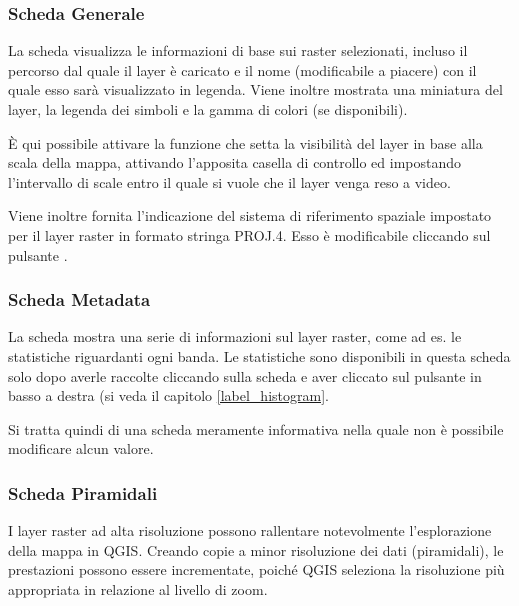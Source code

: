 \subsubsection{Scheda Generale}\label{label_generaltab}

La scheda  visualizza le informazioni di base sui raster selezionati,
incluso il percorso dal quale il layer è caricato e il nome (modificabile a
piacere) con il quale esso sarà visualizzato in legenda. Viene inoltre
mostrata una miniatura del layer, la legenda dei simboli e la gamma di
colori (se disponibili). 

È qui possibile attivare la funzione che setta la visibilità del layer
in base alla scala della mappa, attivando l'apposita casella di controllo ed
impostando l'intervallo di scale entro il quale si vuole che il layer venga
reso a video.

Viene inoltre fornita l'indicazione del sistema di riferimento spaziale
impostato per il layer raster in formato stringa PROJ.4. Esso è modificabile
cliccando sul pulsante .

\subsubsection{Scheda Metadata}\label{label_metatab}

La scheda  mostra una serie di informazioni sul layer
raster, come ad es. le statistiche riguardanti ogni banda. Le statistiche sono
disponibili in questa scheda solo dopo averle raccolte cliccando sulla
scheda  e aver cliccato sul pulsante  in
basso a destra (si veda il capitolo \ref{label_histogram}.

Si tratta quindi di una scheda meramente informativa nella quale non è
possibile modificare alcun valore.

\subsubsection{Scheda Piramidali}\label{raster_pyramids}

I layer raster ad alta risoluzione possono rallentare notevolmente
l'esplorazione della mappa in QGIS. Creando copie a minor risoluzione dei dati
(piramidali), le prestazioni possono essere incrementate, poiché QGIS seleziona
la risoluzione più appropriata in relazione al livello di zoom.

